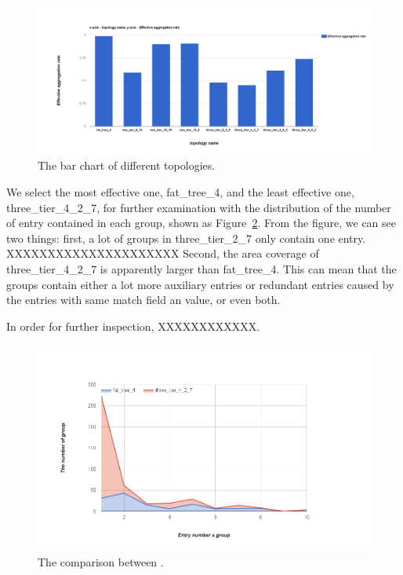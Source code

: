 \begin{figure}[H]
\begin{center} 
\includegraphics[width=1.4\linewidth]{figures/exp_topotype_bar.png}
\end{center}
\caption{The bar chart of different topologies.}
\label{different_topo_bar}
\end{figure}



We select the most effective one, fat\_tree\_4, and the least effective one, three\_tier\_4\_2\_7, for further examination with the distribution of the number of entry contained in each group, shown as Figure~\ref{different_topo_distribute}. From the figure, we can see two things: first, a lot of groups in three\_tier\_2\_7 only contain one entry. XXXXXXXXXXXXXXXXXXXXX
Second, the area coverage of three\_tier\_4\_2\_7 is apparently larger than fat\_tree\_4. This can mean that the groups contain either a lot more auxiliary entries or redundant entries caused by the entries with same match field an value, or even both. 

In order for further inspection, XXXXXXXXXXXX.
\begin{figure}[H]
\begin{center} 
\includegraphics[width=1.4\linewidth]{figures/exp_topotype_distribute.png}
\end{center}
\caption{The comparison between .}
\label{different_topo_distribute}
\end{figure}

